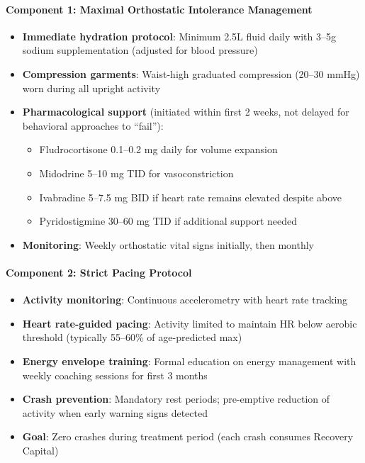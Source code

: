 \paragraph{Component 1: Maximal Orthostatic Intolerance Management}
\begin{itemize}
    \item \textbf{Immediate hydration protocol}: Minimum 2.5L fluid daily with 3--5g sodium supplementation (adjusted for blood pressure)
    \item \textbf{Compression garments}: Waist-high graduated compression (20--30 mmHg) worn during all upright activity
    \item \textbf{Pharmacological support} (initiated within first 2 weeks, not delayed for behavioral approaches to ``fail''):
    \begin{itemize}
        \item Fludrocortisone 0.1--0.2 mg daily for volume expansion
        \item Midodrine 5--10 mg TID for vasoconstriction
        \item Ivabradine 5--7.5 mg BID if heart rate remains elevated despite above
        \item Pyridostigmine 30--60 mg TID if additional support needed
    \end{itemize}
    \item \textbf{Monitoring}: Weekly orthostatic vital signs initially, then monthly
\end{itemize}

\paragraph{Component 2: Strict Pacing Protocol}
\begin{itemize}
    \item \textbf{Activity monitoring}: Continuous accelerometry with heart rate tracking
    \item \textbf{Heart rate-guided pacing}: Activity limited to maintain HR below aerobic threshold (typically 55--60\% of age-predicted max)
    \item \textbf{Energy envelope training}: Formal education on energy management with weekly coaching sessions for first 3 months
    \item \textbf{Crash prevention}: Mandatory rest periods; pre-emptive reduction of activity when early warning signs detected
    \item \textbf{Goal}: Zero crashes during treatment period (each crash consumes Recovery Capital)
\end{itemize}

